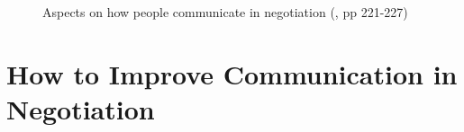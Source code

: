 \documentclass[
  ignorenonframetext,
]{beamer}
\begin{document}
\begin{frame}{}
\label{section-13}
\begin{figure}


\caption{\label{fig-aspect-on-how-people-communicate-in-negotiation}Aspects
on how people communicate in negotiation
(, pp 221-227)}

\end{figure}%
\end{frame}

\section{How to Improve Communication in
Negotiation}\label{how-to-improve-communication-in-negotiation}
\end{document}
